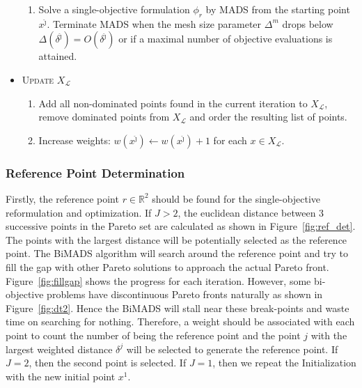 \documentclass[11pt,oneside,onecolumn,openright]{article}
\begin{document}
\begin{algorithm}[H]
\begin{algorithmic}
\begin{itemize}
              \begin{enumerate}[]
                  \item Solve a single-objective formulation $\phi_r$ by MADS from the starting point $x^{\hat{\jmath}}$. Terminate MADS when the mesh size parameter $\Delta^m$ drops below $\Delta\left(\delta^{\hat{\jmath}}\right)=O\left(\delta^{\hat{\jmath}}\right)$ or if a maximal number of objective evaluations is attained.
              \end{enumerate} 
            \item \textsc{Update} $X_{\mathcal{L}}$
              \begin{enumerate}[]
                  \item Add all non-dominated points found in the current iteration to $X_{\mathcal{L}}$, remove dominated points from $X_{\mathcal{L}}$ and order the resulting list of points.
                  \item Increase weights: $w\left(x^{\hat{\jmath}}\right) \leftarrow w\left(x^{\hat{\jmath}}\right)+1$ for each $x \in X_{\mathcal{L}}$.
              \end{enumerate} 
          \end{itemize}
      \end{algorithmic} 
    \end{algorithm} 
    \subsubsection*{Reference Point Determination}\label{sec:weight}
    Firstly, the reference point $r\in \mathbb{R}^2$ should be found for the single-objective reformulation and optimization. If $J>2$, the euclidean distance between 3 successive points in the Pareto set are calculated as shown in Figure~\ref{fig:ref_det}. The points with the largest distance will be potentially selected as the reference point. The BiMADS algorithm will search around the reference point and try to fill the gap with other Pareto solutions to approach the actual Pareto front. Figure~\ref{fig:fillgap} shows the progress for each iteration. However, some bi-objective problems have discontinuous Pareto fronts naturally as shown in Figure~\ref{fig:dt2}. Hence the BiMADS will stall near these break-points and waste time on searching for nothing. Therefore, a weight should be associated with each point to count the number of being the reference point and the point $j$ with the largest weighted distance $\delta^j$ will be selected to generate the reference point. If $J=2$, then the second point is selected. If $J=1$, then we repeat the Initialization with the new initial point $x^1$.
\end{document}
